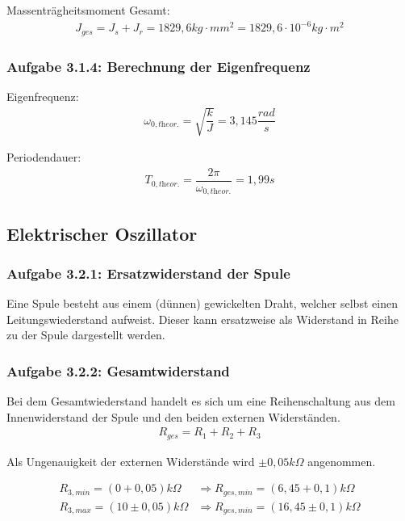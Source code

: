 \documentclass[a4paper]{scrartcl}
\numberwithin{equation}{subsection}
\begin{document}
Massenträgheitsmoment Gesamt:
\begin{align}
J_{ges} = J_{s} + J_{r} = 1829,6 kg \cdot mm^2 = 1829,6 \cdot 10^{-6} kg \cdot m^2
\end{align}
	
\subsubsection{Aufgabe 3.1.4: Berechnung der Eigenfrequenz}

Eigenfrequenz:
\begin{align}
\omega_{0,\textit{theor.}} = \sqrt{\dfrac{k}{J}} = 3,145 \dfrac{rad}{s}
\end{align}

Periodendauer:
\begin{align}
T_{0,\textit{theor.}} = \dfrac{2\pi}{\omega_{0,\textit{theor.}}} = 1,99s
\end{align}

\subsection{Elektrischer Oszillator}
\subsubsection{Aufgabe 3.2.1: Ersatzwiderstand der Spule}

Eine Spule besteht aus einem (dünnen) gewickelten Draht, welcher selbst einen Leitungswiederstand aufweist.
Dieser kann ersatzweise als Widerstand in Reihe zu der Spule dargestellt werden.

\subsubsection{Aufgabe 3.2.2: Gesamtwiderstand}

Bei dem Gesamtwiederstand handelt es sich um eine Reihenschaltung aus dem Innenwiderstand der Spule und den beiden externen Widerständen. 
\begin{align}
R_{ges} = R_1 + R_2 + R_3
\end{align}

Als Ungenauigkeit der externen Widerstände wird $\pm 0,05 k \Omega$ angenommen.

\begin{align*}
R_{3,min} = (0+0,05)k\Omega &\Rightarrow R_{ges,min} = (6,45+0,1)k\Omega \\
R_{3,max} = (10\pm0,05)k\Omega &\Rightarrow R_{ges,min} = (16,45\pm0,1)k\Omega
\end{align*}
\end{document}
